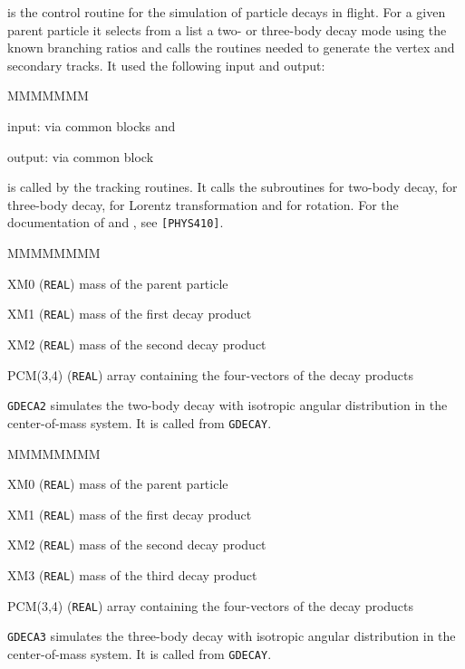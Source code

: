  is the control routine for the simulation of particle
decays in flight. For a given parent particle it selects from a list a
two- or three-body decay mode using the known branching ratios and calls the
routines needed to generate the vertex and secondary tracks.
It used the following input and output:
\begin{DLtt}{MMMMMMM}
\item[input:]  via common blocks  and 
\item[output:] via common block  
\end{DLtt}
 is called by the tracking routines.
It calls the subroutines 
 for two-body decay,  for three-body decay,
 for Lorentz transformation and  for rotation.
For the documentation of  and , see {\tt [PHYS410]}.
\begin{DLtt}{MMMMMMMM}
\item[XM0] ({\tt REAL}) mass of the parent particle
\item[XM1] ({\tt REAL}) mass of the first decay product
\item[XM2] ({\tt REAL}) mass of the second decay product
\item[PCM(3,4)] ({\tt REAL}) array containing the four-vectors of
the decay products
\end{DLtt}
{\tt GDECA2} simulates the two-body decay with isotropic angular
distribution in the center-of-mass system. It is called from
{\tt GDECAY}.
\begin{DLtt}{MMMMMMMM}
\item[XM0] ({\tt REAL}) mass of the parent particle
\item[XM1] ({\tt REAL}) mass of the first decay product
\item[XM2] ({\tt REAL}) mass of the second decay product
\item[XM3] ({\tt REAL}) mass of the third decay product
\item[PCM(3,4)] ({\tt REAL}) array containing the four-vectors of
the decay products
\end{DLtt}
{\tt GDECA3} simulates the three-body decay 
with isotropic angular distribution in the center-of-mass system.
It is called from {\tt GDECAY}.

